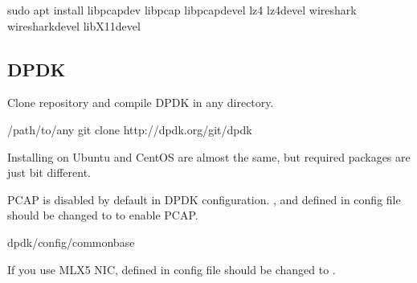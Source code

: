 \documentclass[a4paper,11pt,openany,oneside,english]{sphinxmanual}
\begin{document}
\begin{sphinxVerbatim}[commandchars=\\\{\},formatcom=\footnotesize]
 sudo apt install libpcap\PYGZhy{}dev 
  libpcap 
  libpcap\PYGZhy{}devel 
  lz4 
  lz4\PYGZhy{}devel 
  wireshark 
  wireshark\PYGZhy{}devel 
  libX11\PYGZhy{}devel
\end{sphinxVerbatim}


\subsection{DPDK}
\label{\detokenize{gsg/install:dpdk}}\label{\detokenize{gsg/install:setup-install-dpdk}}
Clone repository and compile DPDK in any directory.

\begin{sphinxVerbatim}[commandchars=\\\{\},formatcom=\footnotesize]
  /path/to/any
 git clone http://dpdk.org/git/dpdk
\end{sphinxVerbatim}

Installing on Ubuntu and CentOS are almost the same, but required packages
are just bit different.

PCAP is disabled by default in DPDK configuration.
,  and
 defined in config file  should be
changed to  to enable PCAP.

\begin{sphinxVerbatim}[commandchars=\\\{\},formatcom=\footnotesize]
 dpdk/config/common\PYGZus{}base
\end{sphinxVerbatim}

If you use MLX5 NIC,  defined in
config file  should be changed to .
\end{document}
